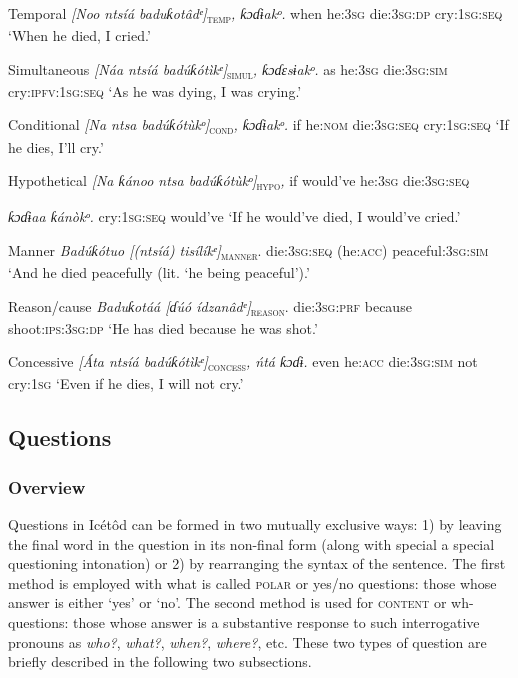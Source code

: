 Temporal
\textit{[Noo   ntsíá     baduƙotâdᵉ]}\textsc{\textsubscript{temp}}\textit{,   ƙɔɗɨakᵒ.}
when   he:\textsc{3sg}   die:\textsc{3sg:dp}     cry:\textsc{1sg:seq}
‘When he died, I cried.’




Simultaneous
\textit{[Náa   ntsíá     badúƙótìkᵉ]}\textsc{\textsubscript{simul}}\textit{,   ƙɔɗɛsɨakᵒ.}
as   he:\textsc{3sg}   die:\textsc{3sg:sim}    cry:\textsc{ipfv}:\textsc{1sg:seq}
‘As he was dying, I was crying.’




Conditional
\textit{[Na   ntsa     badúƙótùkᵒ]}\textsc{\textsubscript{cond}}\textit{,   ƙɔɗɨakᵒ.}
if   he:\textsc{nom}   die:\textsc{3sg:seq}     cry:\textsc{1sg:seq}
‘If he dies, I’ll cry.’




Hypothetical
\textit{[Na   ƙánoo   ntsa    badúƙótùkᵒ]}\textsc{\textsubscript{hypo}}\textit{,} 
if   would’ve   he:\textsc{3sg}  die:\textsc{3sg:seq}   

\textit{ƙɔɗɨaa   ƙánòkᵒ.}
cry:\textsc{1sg:seq}  would’ve
‘If he would’ve died, I would’ve cried.’




Manner
\textit{Badúƙótuo   [(ntsíá)   tisílíkᵉ]}\textsc{\textsubscript{manner}}.
die:\textsc{3sg:seq}   (he:\textsc{acc})  peaceful:3\textsc{sg:sim}
‘And he died peacefully (lit. ‘he being peaceful’).’




Reason/cause
\textit{Baduƙotáá   [ɗúó     ídzanâdᵉ]}\textsc{\textsubscript{reason}}.
die:\textsc{3sg:prf}   because   shoot:\textsc{ips:3sg:dp}
‘He has died because he was shot.’




Concessive
\textit{[Áta   ntsíá     badúƙótìkᵉ]}\textsc{\textsubscript{concess}}\textit{,   ńtá   ƙɔɗɨ.}
even   he:\textsc{acc}   die:\textsc{3sg:sim}    not   cry:\textsc{1sg}
‘Even if he dies, I will not cry.’






\subsection{Questions}
\subsubsection{Overview}

Questions in Icétôd can be formed in two mutually exclusive ways: 1) by leaving the final word in the question in its non-final form (along with special a special questioning intonation) or 2) by rearranging the syntax of the sentence. The first method is employed with what is called \textsc{polar} or yes/no questions: those whose answer is either ‘yes’ or ‘no’. The second method is used for \textsc{content} or wh-questions: those whose answer is a substantive response to such interrogative pronouns as \textit{who?}, \textit{what?}, \textit{when?}, \textit{where?}, etc. These two types of question are briefly described in the following two subsections.


